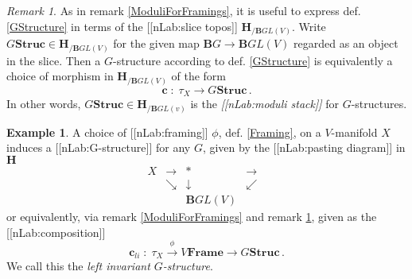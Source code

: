\documentclass[12pt,titlepage]{article}
\newcommand{\itexarray}[1]{\begin{matrix}#1\end{matrix}}
\theoremstyle{plain}
\theoremstyle{definition}
\newtheorem{example}{Example}
\theoremstyle{remark}
\newtheorem{remark}{Remark}
\begin{document}
\begin{remark}
\label{ModuliForGStructures}\hypertarget{ModuliForGStructures}{}
As in remark \ref{ModuliForFramings}, it is useful to express def. \ref{GStructure} in terms of the [[nLab:slice topos]] $\mathbf{H}_{/\mathbf{B}GL(V)}$. Write $G\mathbf{Struc}\in \mathbf{H}_{/\mathbf{B}GL(V)}$ for the given map $\mathbf{B}G\to \mathbf{B}GL(V)$ regarded as an object in the slice. Then a $G$-structure according to def. \ref{GStructure} is equivalently a choice of morphism in $\mathbf{H}_{/\mathbf{B}GL(V)}$ of the form
\begin{displaymath}
\mathbf{c} \;\colon\; \tau_X \longrightarrow G\mathbf{Struc}
  \,.
\end{displaymath}
In other words, $G\mathbf{Struc} \in \mathbf{H}_{/\mathbf{B}GL(v)}$ is the \emph{[[nLab:moduli stack]]} for $G$-structures.
\end{remark}
\begin{example}
\label{GStructureFromLeftTranslationFraming}\hypertarget{GStructureFromLeftTranslationFraming}{}
A choice of [[nLab:framing]] $\phi$, def. \ref{Framing}, on a $V$-manifold $X$ induces a [[nLab:G-structure]] for any $G$, given by the [[nLab:pasting diagram]] in $\mathbf{H}$
\begin{displaymath}
\itexarray{
     X &\longrightarrow& \ast &\longrightarrow&
     \\
     & \searrow & \downarrow & \swarrow
     \\
     && \mathbf{B}GL(V)
  }
\end{displaymath}
or equivalently, via remark \ref{ModuliForFramings} and remark \ref{ModuliForGStructures}, given as the [[nLab:composition]]
\begin{displaymath}
\mathbf{c}_{li}
  \;\colon\;
  \tau_X \stackrel{\phi}{\longrightarrow} V\mathbf{Frame} \longrightarrow G\mathbf{Struc}\,.
\end{displaymath}
We call this the \emph{left invariant $G$-structure}.
\end{example}
\end{document}
